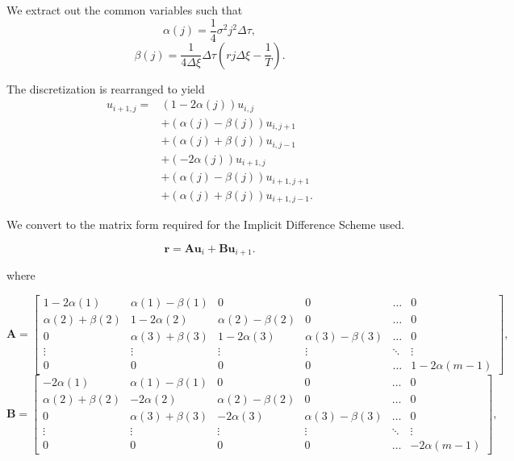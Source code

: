 \documentclass[12pt]{report}
\begin{document}
We extract out the common variables such that
\begin{equation}
  \alpha(j) = \frac{1}{4}\sigma^2j^2\Delta\tau,
\end{equation}
\begin{equation}
  \beta(j) = \frac{1}{4\Delta\xi}\Delta\tau(rj\Delta\xi - \frac{1}{T}).
\end{equation}

The discretization is rearranged to yield
\begin{equation}
  \begin{split}
    u_{i+1, j} = & (1-2\alpha(j))u_{i, j} \\
    & + (\alpha(j)-\beta(j))u_{i, j+1}\\
    & + (\alpha(j)+\beta(j))u_{i, j-1}\\
    & + (-2\alpha(j))u_{i+1, j}\\
    & + (\alpha(j)-\beta(j))u_{i+1, j+1}\\
    & + (\alpha(j)+\beta(j))u_{i+1, j-1}.
  \end{split}
\end{equation}

We convert to the matrix form required for the Implicit Difference Scheme used.

\begin{equation}
  \textbf{r} = \textbf{Au}_{i} + \textbf{Bu}_{i+1}.
\end{equation}

where

\begin{equation}
  \textbf{A} = \begin{bmatrix}
    1-2\alpha(1) & \alpha(1) - \beta(1) & 0 & 0 & \hdots & 0 \\
    \alpha(2) + \beta(2) & 1-2\alpha(2) & \alpha(2) - \beta(2) & 0 & \hdots & 0 \\
    0 & \alpha(3) + \beta(3) & 1-2\alpha(3) & \alpha(3) - \beta(3) & \hdots & 0 \\
    \vdots & \vdots & \vdots & \vdots & \ddots & \vdots \\
    0 & 0 & 0 & 0 & \hdots & 1-2\alpha(m-1)
  \end{bmatrix},
\end{equation}
\begin{equation}
  \textbf{B} = \begin{bmatrix}
    -2\alpha(1) & \alpha(1) - \beta(1) & 0 & 0 & \hdots & 0 \\
    \alpha(2) + \beta(2) & -2\alpha(2) & \alpha(2) - \beta(2) & 0 & \hdots & 0 \\
    0 & \alpha(3) + \beta(3) & -2\alpha(3) & \alpha(3) - \beta(3) & \hdots & 0 \\
    \vdots & \vdots & \vdots & \vdots & \ddots & \vdots \\
    0 & 0 & 0 & 0 & \hdots & -2\alpha(m-1)
  \end{bmatrix},
\end{equation}
\end{document}
